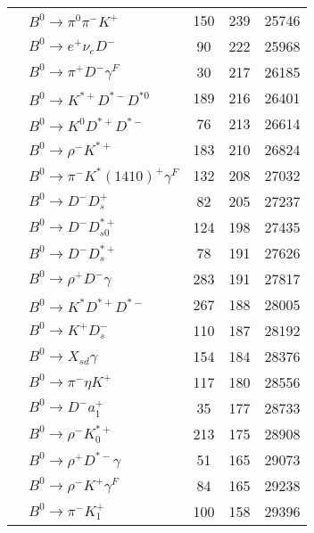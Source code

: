 \documentclass[landscape]{article}
\newcounter{rownumbers}
\newcommand\rn{\stepcounter{rownumbers}\arabic{rownumbers}}
\newcommand{\EOL}{\\} %
\newcommand{\topoTags}[1]{#1} %
\begin{document}
\begin{longtable}{clccc}
\rn & $ B^{0} \rightarrow \pi^{0} \pi^{-} K^{+} $ & \topoTags{150 & }239 & 25746 \EOL

\rn & $ B^{0} \rightarrow e^{+} \nu_{e} D^{-} $ & \topoTags{90 & }222 & 25968 \EOL

\rn & $ B^{0} \rightarrow \pi^{+} D^{-} \gamma^{F} $ & \topoTags{30 & }217 & 26185 \EOL

\rn & $ B^{0} \rightarrow K^{*+} D^{*-} D^{*0} $ & \topoTags{189 & }216 & 26401 \EOL

\rn & $ B^{0} \rightarrow K^{0} D^{*+} D^{*-} $ & \topoTags{76 & }213 & 26614 \EOL

\rn & $ B^{0} \rightarrow \rho^{-} K^{*+} $ & \topoTags{183 & }210 & 26824 \EOL

\rn & $ B^{0} \rightarrow \pi^{-} K^{*}(1410)^{+} \gamma^{F} $ & \topoTags{132 & }208 & 27032 \EOL

\rn & $ B^{0} \rightarrow D^{-} D_{s}^{+} $ & \topoTags{82 & }205 & 27237 \EOL

\rn & $ B^{0} \rightarrow D^{-} D_{s0}^{*+} $ & \topoTags{124 & }198 & 27435 \EOL

\rn & $ B^{0} \rightarrow D^{-} D_{s}^{*+} $ & \topoTags{78 & }191 & 27626 \EOL

\rn & $ B^{0} \rightarrow \rho^{+} D^{-} \gamma $ & \topoTags{283 & }191 & 27817 \EOL

\rn & $ B^{0} \rightarrow K^{*} D^{*+} D^{*-} $ & \topoTags{267 & }188 & 28005 \EOL

\rn & $ B^{0} \rightarrow K^{+} D_{s}^{-} $ & \topoTags{110 & }187 & 28192 \EOL

\rn & $ B^{0} \rightarrow X_{sd} \gamma $ & \topoTags{154 & }184 & 28376 \EOL

\rn & $ B^{0} \rightarrow \pi^{-} \eta K^{+} $ & \topoTags{117 & }180 & 28556 \EOL

\rn & $ B^{0} \rightarrow D^{-} a_{1}^{+} $ & \topoTags{35 & }177 & 28733 \EOL

\rn & $ B^{0} \rightarrow \rho^{-} K_{0}^{*+} $ & \topoTags{213 & }175 & 28908 \EOL

\rn & $ B^{0} \rightarrow \rho^{+} D^{*-} \gamma $ & \topoTags{51 & }165 & 29073 \EOL

\rn & $ B^{0} \rightarrow \rho^{-} K^{+} \gamma^{F} $ & \topoTags{84 & }165 & 29238 \EOL

\rn & $ B^{0} \rightarrow \pi^{-} K_1^{+} $ & \topoTags{100 & }158 & 29396 \EOL


\end{longtable}
\end{document}
